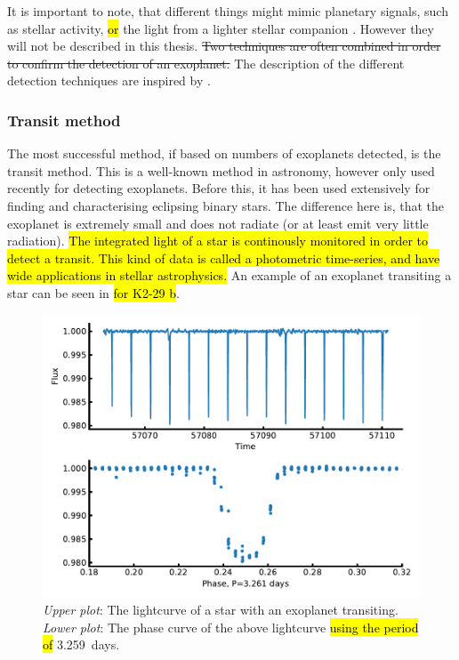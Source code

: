 It is important to note, that different things might mimic planetary signals, such as stellar
activity, \hl{or} the light from a lighter stellar companion \citep[see
e.g.][]{Oshagh2013,Oshagh2014}. However they will not be described in this thesis. \st{Two
techniques are often combined in order to confirm the detection of an exoplanet.} The description of
the different detection techniques are inspired by \citet{Seager2010}.


\subsubsection{Transit method}
\label{sec:transitMethod}

The most successful method, if based on numbers of exoplanets detected, is the transit method. This
is a well-known method in astronomy, however only used recently for detecting exoplanets. Before
this, it has been used extensively for finding and characterising eclipsing binary stars. The
difference here is, that the exoplanet is extremely small and does not radiate (or at least emit
very little radiation). \hl{The integrated light of a star is continously monitored in order to
detect a transit. This kind of data is called a photometric time-series, and have wide applications
in stellar astrophysics.} An example of an exoplanet transiting a star can be seen in
 \hl{for K2-29 b}.

\begin{figure}[htpb!]
    \centering
    \includegraphics[width=1.0\linewidth]{figures/transitMethod.pdf}
    \caption{\emph{Upper plot}: The lightcurve of a star with an exoplanet transiting.
             \emph{Lower plot}: The phase curve of the above lightcurve \hl{using the period of}
             \SI{3.259}{days}.}
    \label{fig:transitMethod}
\end{figure}

